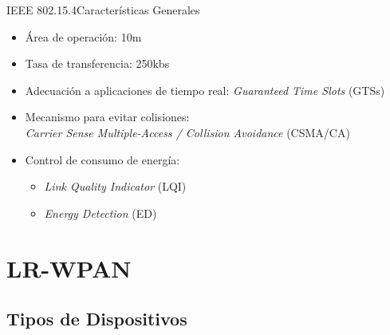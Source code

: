 \documentclass[aspectratio=169]{beamer}
\begin{document}
\begin{frame}{IEEE 802.15.4}{Características Generales}
	
	\begin{itemize}
		\item Área de operación: 10m
		\vspace{5px}
		\item Tasa de transferencia: 250kbs
		\vspace{5px}
		\item Adecuación a aplicaciones de tiempo real: \textit{Guaranteed Time Slots} (GTSs)
		\vspace{5px}
		\item Mecanismo para evitar colisiones:\\ \textit{Carrier Sense Multiple-Access / Collision Avoidance} (CSMA/CA)
		\vspace{5px}
		\item Control de consumo de energía: 
		\begin{itemize}
			\item \textit{Link Quality Indicator} (LQI)
			\item \textit{Energy Detection} (ED)
		\end{itemize}
	\end{itemize}
	
\end{frame}


\section{LR-WPAN}

\subsection[Dispositivos]{Tipos de Dispositivos}
\end{document}
